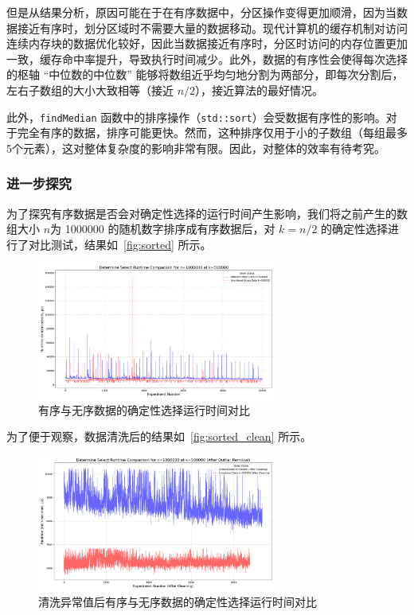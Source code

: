 但是从结果分析，原因可能在于在有序数据中，分区操作变得更加顺滑，因为当数据接近有序时，划分区域时不需要大量的数据移动。现代计算机的缓存机制对访问连续内存块的数据优化较好，因此当数据接近有序时，分区时访问的内存位置更加一致，缓存命中率提升，导致执行时间减少。此外，数据的有序性会使得每次选择的枢轴 ``中位数的中位数'' 能够将数组近乎均匀地分割为两部分，即每次分割后，左右子数组的大小大致相等（接近 $n/2$），接近算法的最好情况。

此外，\texttt{findMedian} 函数中的排序操作（\texttt{std::sort}）会受数据有序性的影响。对于完全有序的数据，排序可能更快。然而，这种排序仅用于小的子数组（每组最多5个元素），这对整体复杂度的影响非常有限。因此，对整体的效率有待考究。

\subsubsection{进一步探究}

为了探究有序数据是否会对确定性选择的运行时间产生影响，我们将之前产生的数组大小 $n$为 1000000 的随机数字排序成有序数据后，对 $k = n / 2$ 的确定性选择进行了对比测试，结果如~\autoref{fig:sorted} 所示。
\begin{figure}[htbp]
    \centering
    \includegraphics[width=0.7\textwidth]{../figure/determine_continue_order_vs_unorder.png}
    \caption{有序与无序数据的确定性选择运行时间对比}
    \label{fig:sorted}
\end{figure}

为了便于观察，数据清洗后的结果如~\autoref{fig:sorted_clean} 所示。
\begin{figure}[htbp]
    \centering
    \includegraphics[width=0.7\textwidth]{../figure/determine_continue_order_vs_unorder_cleaned.png}
    \caption{清洗异常值后有序与无序数据的确定性选择运行时间对比}
    \label{fig:sorted_clean}
\end{figure}

